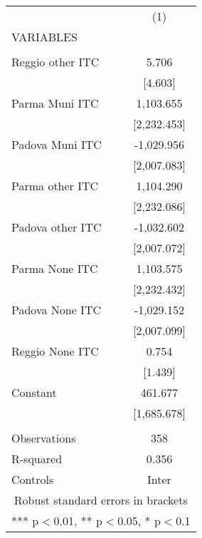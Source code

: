 \begin{tabular}{lc} \hline
 & (1) \\
VARIABLES &  \\ \hline
 &  \\
Reggio other ITC & 5.706 \\
 & [4.603] \\
Parma Muni ITC & 1,103.655 \\
 & [2,232.453] \\
Padova Muni ITC & -1,029.956 \\
 & [2,007.083] \\
Parma other ITC & 1,104.290 \\
 & [2,232.086] \\
Padova other ITC & -1,032.602 \\
 & [2,007.072] \\
Parma None ITC & 1,103.575 \\
 & [2,232.432] \\
Padova None ITC & -1,029.152 \\
 & [2,007.099] \\
Reggio None ITC & 0.754 \\
 & [1.439] \\
Constant & 461.677 \\
 & [1,685.678] \\
 &  \\
Observations & 358 \\
R-squared & 0.356 \\
 Controls & Inter \\ \hline
\multicolumn{2}{c}{ Robust standard errors in brackets} \\
\multicolumn{2}{c}{ *** p$<$0.01, ** p$<$0.05, * p$<$0.1} \\
\end{tabular}
